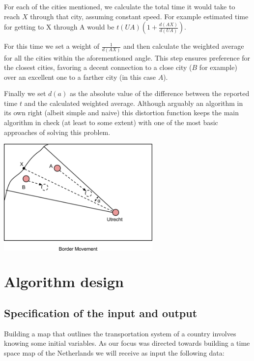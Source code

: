 \documentclass[a4paper,11pt]{article}
\begin{document}
\begin{enumerate}[(i)]
      For each of the cities mentioned, we calculate the total time it
      would take to reach $X$ through that city, assuming constant
      speed. For example estimated time for getting to X through A
      would be $t(UA)(1 + \frac{d(AX)}{d(UA)})$.

      For this time we set a weight of $\frac{1}{d(AX)}$ and then calculate the
      weighted average for all the cities within the aforementioned
      angle. This step ensures preference for the closest cities,
      favoring a decent connection to a close city ($B$ for example)
      over an excellent one to a farther city (in this case $A$).

      Finally we set $d(a)$ as the absolute value of the difference
      between the reported time $t$ and the calculated weighted
      average. Although arguably an algorithm in its own right (albeit
      simple and naive) this distortion function keeps the main
      algorithm in check (at least to some extent) with one of the
      most basic approaches of solving this problem.

    \begin{center}
        \includegraphics[width=0.6\textwidth]{quant7.png}
    \end{center}
\end{enumerate}

\section{Algorithm design}

\subsection{Specification of the input and output}

Building a map that outlines the transportation system of a country
involves knowing some initial variables. As our focus was directed
towards building a time space map of the Netherlands we will receive
as input the following data:
\end{document}
